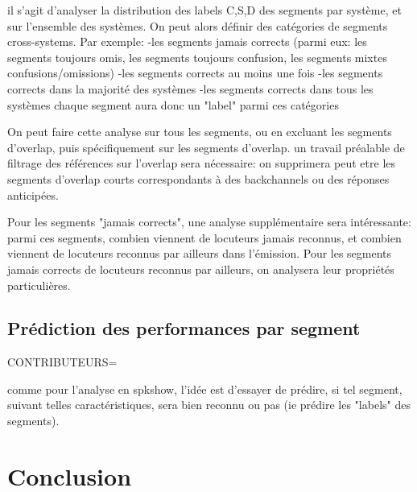\documentclass[utf8x]{article-hermes}
\begin{document}
il s'agit d'analyser la distribution des labels C,S,D  des segments par système, et sur l'ensemble des systèmes.
On peut alors définir des catégories de segments cross-systems.
Par exemple:
-les segments jamais corrects
(parmi eux: les segments toujours omis, les segments toujours confusion, les segments mixtes confusions/omissions)
-les segments corrects au moins une fois
-les segments corrects dans la majorité des systèmes
-les segments corrects dans tous les systèmes
chaque segment aura donc un "label" parmi ces catégories

On peut faire cette analyse sur tous les segments, ou en excluant les segments d'overlap, puis spécifiquement sur les segments d'overlap.
un travail préalable de filtrage des références sur l'overlap sera nécessaire: on supprimera peut etre les segments d'overlap courts correspondants à des backchannels ou des réponses anticipées.


Pour les segments "jamais corrects", une analyse supplémentaire sera intéressante: parmi ces segments, combien viennent de locuteurs jamais reconnus, et combien viennent de locuteurs reconnus par ailleurs dans l'émission. Pour les segments jamais corrects de locuteurs reconnus par ailleurs, on analysera leur propriétés particulières.

\subsection{Prédiction des performances par segment}
CONTRIBUTEURS=

comme pour l'analyse en spkshow, l'idée est d'essayer de prédire, si tel segment, suivant telles caractéristiques, sera bien reconnu ou pas (ie prédire les "labels" des segments). 



\section{Conclusion}



\end{document}
